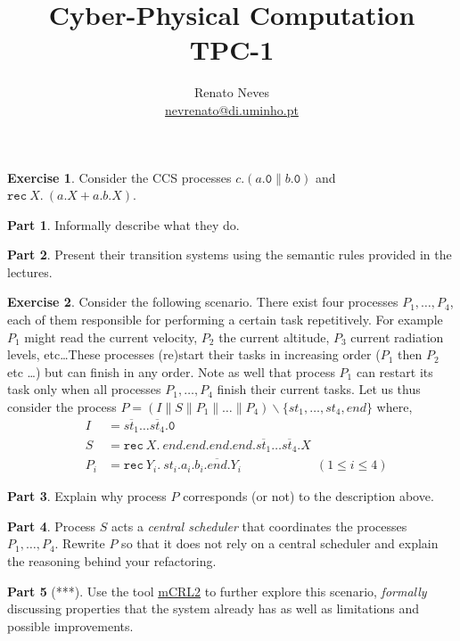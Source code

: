 \documentclass[a4paper, 11pt]{article}
\date{}
\theoremstyle{definition}
\newtheorem{exercise}{Exercise}
\theoremstyle{sub}
\newtheorem{subexercise}{Part}[exercise]
\begin{document}
\title{Cyber-Physical Computation \\ \large TPC-1}
\author{Renato Neves \\ \scriptsize
  \href{mailto:nevrenato@di.uminho.pt}{nevrenato@di.uminho.pt}}
\maketitle

\begin{exercise}
  Consider the CCS processes $c . (a. \mathtt{0} \parallel b. \mathtt{0})$ and
  $\mathtt{rec}\ X.\ (a.X + a.b.X)$. 
  \begin{subexercise}
    Informally describe what they do.
  \end{subexercise}
  \begin{subexercise}
    Present their transition systems using the semantic rules provided in the
    lectures.
  \end{subexercise} 
\end{exercise}

\begin{exercise}
  Consider the following scenario. There exist  four processes $P_1,\dots,P_4$,
  each of them responsible for performing a certain task repetitively. For
  example $P_1$ might read the current velocity, $P_2$ the current altitude,
  $P_3$ current radiation levels, etc\dots These processes (re)start their
  tasks in increasing order ($P_1$ then $P_2$ etc \dots) but can finish in any
  order. Note as well that process $P_1$ can restart its task only when all
  processes $P_1,\dots,P_4$ finish their current tasks.  Let us thus consider
  the process $P = (I \parallel S \parallel P_1 \parallel \dots \parallel P_4)
  \backslash \{st_1,\dots,st_4,end\}$ where,
  \begin{eqnarray*}
    & I  & = \overline{st_1} \dots \overline{st_4} . \mathtt{0} \\
    & S & = \mathtt{rec}\ X.\ end.end.end.end. \overline{st_1} \dots \overline{st_4}. X \\
    & P_i & = \mathtt{rec}\ Y_i .\ st_i . a_i . b_i . \overline{end} . Y_i \qquad \qquad \qquad
            (1 \leq i \leq 4)
  \end{eqnarray*}
  \begin{subexercise}
    Explain why process $P$ corresponds (or not) to the description above.
  \end{subexercise}
  \begin{subexercise}
    Process $S$ acts a \emph{central scheduler} that coordinates the processes
    $P_1,\dots,P_4$. Rewrite $P$ so that it does not rely on a central
    scheduler and explain the reasoning behind your refactoring.
  \end{subexercise}
  \begin{subexercise}[***]
    Use the tool \href{https://www.mcrl2.org/web/user_manual/index.html}{mCRL2}
    to further explore this scenario, \emph{formally} discussing properties
    that the system already has as well as limitations and possible
    improvements.
  \end{subexercise}
\end{exercise}
\end{document}
